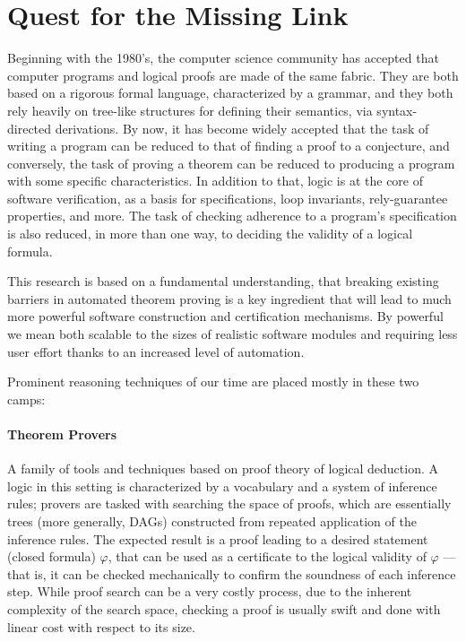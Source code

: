 
\section{Quest for the Missing Link}

Beginning with the 1980's, the computer science community has accepted
that computer programs and logical proofs are made of the same fabric.
They are both based on a rigorous formal language, characterized by a grammar,
and they both rely heavily on tree-like structures for defining their semantics,
via syntax-directed derivations.
By now, it has become widely accepted that the task of writing a program can be
reduced to that of finding a proof to a conjecture, and conversely, the task of
proving a theorem can be reduced to producing a program with some specific
characteristics.
In addition to that, logic is at the core of software verification, as a basis
for specifications, loop invariants, rely-guarantee properties, and more.
The task of checking adherence to a program's specification is also reduced, in
more than one way, to deciding the validity of a logical formula.

This research is based on a fundamental understanding, that breaking existing
barriers in automated theorem proving is a key ingredient that will lead to
much more powerful software construction and certification mechanisms.
By powerful we mean both scalable to the sizes of realistic software modules
and requiring less user effort thanks to an increased level of automation.

Prominent reasoning techniques of our time are placed mostly in these two camps:

\paragraph{Theorem Provers} A family of tools and techniques based on proof
theory of logical deduction.
A logic in this setting is characterized by a vocabulary and a system of
inference rules; provers are tasked with searching the space of proofs, which
are essentially trees (more generally, DAGs) constructed from repeated
application of the inference rules.
The expected result is a proof leading to a desired statement (closed formula)
$\varphi$, that can be used as a certificate to the logical validity of
$\varphi$ --- that is, it can be checked mechanically to confirm the soundness
of each inference step.
While proof search can be a very costly process, due to the inherent complexity
of the search space, checking a proof is usually swift and done with linear
cost with respect to its size.

